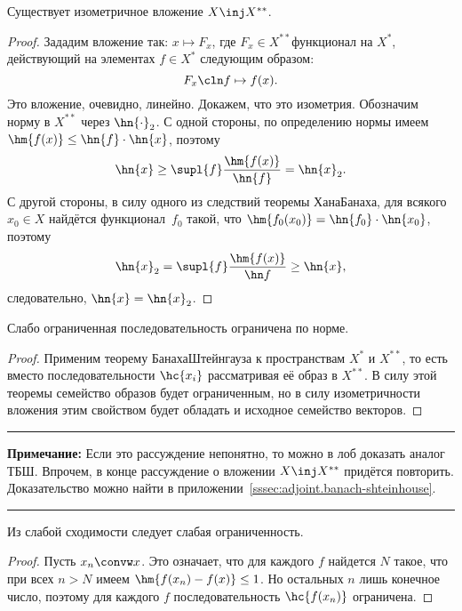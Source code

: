 \documentclass[a4paper]{article}
\newcommand{\comment}[1]{\par\vskip2pt\hrule\vskip2pt{\footnotesize \textbf{Примечание:} #1\par}\vskip2pt\hrule\vskip2pt}
\begin{document}
\begin{lemma}
Существует изометричное вложение $X \inj X^{**}$.
\end{lemma}
\begin{proof}
Зададим вложение так: $x \mapsto F_x$, где $F_x \in X^{**}$\т функционал на $X^*$,
действующий на элементах $f \in X^*$ следующим образом:
$$F_x\cln f \mapsto f(x).$$
Это вложение, очевидно, линейно. Докажем, что это изометрия. Обозначим норму в $X^{**}$ через $\hn{\cdot}_2$.
С одной стороны, по определению нормы имеем $\hm{f(x)} \le \hn{f} \cdot \hn{x}$, поэтому
$$\hn{x} \ge \supl{f} \frac{\hm{f(x)}}{\hn{f}} = \hn{x}_2.$$
С другой стороны, в силу одного из следствий теоремы Хана\ч Банаха,
для всякого $x_0 \in X$ найдётся функционал~$f_0$ такой, что
$\hm{f_0(x_0)} = \hn{f_0} \cdot \hn{x_0}$, поэтому
$$\hn{x}_2 = \supl{f}\frac{\hm{f(x)}}{\hn f} \ge \hn{x},$$
следовательно, $\hn{x} = \hn{x}_2$.
\end{proof}

\begin{stm}
Слабо ограниченная последовательность ограничена по норме.
\end{stm}
\begin{proof}
Применим теорему Банаха\ч Штейнгауза к пространствам $X^*$ и $X^{**}$,
то есть вместо последовательности $\hc{x_i}$ рассматривая её образ в $X^{**}$.
В силу этой теоремы семейство образов будет ограниченным, но в силу изометричности вложения
этим свойством будет обладать и исходное семейство векторов.
\end{proof}

\comment{Если это рассуждение непонятно, то можно в лоб доказать аналог ТБШ. Впрочем, в конце
рассуждение о вложении $X \inj X^{**}$ придётся повторить. Доказательство можно найти
в приложении~\ref{sssec:adjoint.banach-shteinhouse}.}

\begin{stm}
Из слабой сходимости следует слабая ограниченность.
\end{stm}
\begin{proof}
Пусть $x_n \convw x$. Это означает, что для каждого $f$ найдется $N$ такое, что при
всех $n>N$ имеем $\hm{f(x_n) - f(x)} \le 1$. Но остальных $n$ лишь конечное число,
поэтому для каждого $f$ последовательность $\hc{f(x_n)}$ ограничена.
\end{proof}
\end{document}
